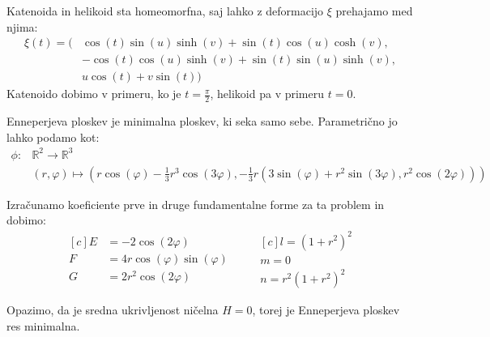 \documentclass[mat1]{fmfdelo}
\newcommand{\R}{\mathbb R}
\begin{document}
Katenoida in helikoid sta homeomorfna, saj lahko z deformacijo $\xi$ prehajamo med njima:
\begin{align*}
    \xi (t) = ( & \cos(t) \sin(u) \sinh(v) + \sin(t) \cos(u) \cosh(v), \\
        & - \cos(t) \cos(u) \sinh(v) + \sin(t) \sin(u) \sinh(v), \\
        & u \cos(t) + v \sin(t)  ) 
\end{align*}
Katenoido dobimo v primeru, ko je $t = \frac{\pi}{2}$, helikoid pa v primeru $t = 0$.

\begin{primer}
    Enneperjeva ploskev je minimalna ploskev, ki seka samo sebe. Parametrično jo lahko podamo kot:
    \begin{align*}
        \phi : & \R^2 \to \R^3 \\
        & (r, \varphi) \mapsto \left( r \cos(\varphi) - \frac{1}{3} r^3 \cos(3 \varphi) , - \frac{1}{3} r \left( 3 \sin(\varphi) + r^2 \sin(3 \varphi), r^2 \cos(2 \varphi) \right) \right)
    \end{align*}

    Izračunamo koeficiente prve in druge fundamentalne forme za ta problem in dobimo:
    \begin{equation*}
        \begin{aligned}[c]
            E &= - 2 \cos(2 \varphi) \\
            F &= 4 r \cos(\varphi) \sin(\varphi) \\
            G &= 2 r^2 \cos(2 \varphi)
        \end{aligned}
        \qquad
        \begin{aligned}[c]
            l = (1 + r^2)^2 \\
            m = 0 \\
            n = r^2 (1 + r^2)^2
        \end{aligned}
    \end{equation*}

    Opazimo, da je sredna ukrivljenost ničelna $ H = 0 $, torej je Enneperjeva ploskev res minimalna.
\end{primer}
\end{document}
